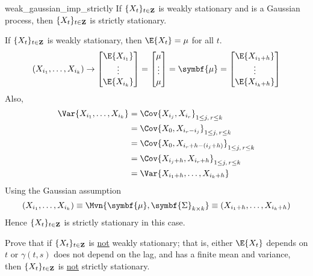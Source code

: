 \begin{Theorem}{}{weak_gaussian_imp_strictly}
    If $ \{X_t\}_{t\in\mathbf{Z}} $ is weakly stationary and is a Gaussian process, then
    $ \{X_t\}_{t\in\mathbf{Z}} $ is strictly stationary.
\end{Theorem}
\begin{Proof}{}{}
    If $ \{X_t\}_{t\in\mathbf{Z}} $ is weakly stationary, then $ \E{X_t}=\mu $ for all $ t $.
    \[ (X_{i_1},\ldots,X_{i_k})\rightarrow
        \begin{bmatrix}
            \E{X_{i_1}} \\
            \vdots      \\
            \E{X_{i_k}}
        \end{bmatrix}=\begin{bmatrix}
            \mu    \\
            \vdots \\
            \mu
        \end{bmatrix}=\symbf{\mu}=
        \begin{bmatrix}
            \E{X_{{i_1}+h}} \\
            \vdots          \\
            \E{X_{{i_k}+h}}
        \end{bmatrix} \]
    Also,
    \begin{align*}
        \Var{X_{i_1},\ldots,X_{i_k}}
         & =\Cov{X_{i_j},X_{i_r}}_{1\le j,\, r\le k}       \\
         & =\Cov{X_0,X_{i_r-i_j}}_{1\le j,\, r\le k}       \\
         & =\Cov{X_0,X_{i_r+h-(i_j+h)}}_{1\le j,\, r\le k} \\
         & =\Cov{X_{i_j+h},X_{i_r+h}}_{1\le j,\, r\le k}   \\
         & =\Var{X_{i_1+h},\ldots,X_{i_k+h}}
    \end{align*}
    Using the Gaussian assumption
    \[ (X_{i_1},\ldots,X_{i_k})
        \equiv\Mvn{\symbf{\mu},\symbf{\Sigma}_{k\times k}}
        \equiv(X_{i_1+h},\ldots,X_{i_k+h}) \]
    Hence $ \{X_{t}\}_{t\in\mathbf{Z}} $ is strictly stationary
    in this case.
\end{Proof}
\begin{Exercise}{}{}
    Prove that if $ \{X_t\}_{t\in\mathbf{Z}} $ is \underline{not}
    weakly stationary; that is, either $ \E{X_t} $ depends on $ t $
    or $ \gamma(t,s) $ does not depend on the lag, and has
    a finite mean and variance,
    then $ \{X_t\}_{t\in\mathbf{Z}} $ is \underline{not} strictly stationary.
\end{Exercise}

